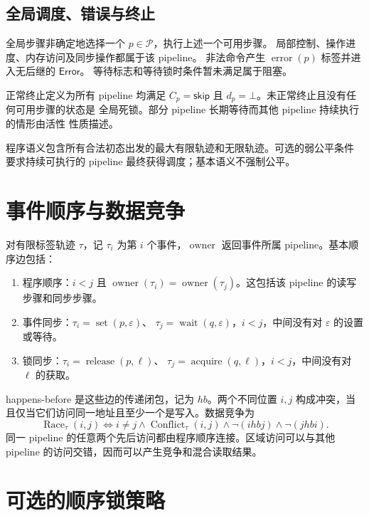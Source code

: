 \documentclass[UTF8,a4paper,11pt,fontset=fandol]{ctexart}
\newcommand{\kw}[1]{\mathsf{#1}}
\begin{document}
\subsection{全局调度、错误与终止}

全局步骤非确定地选择一个 $p\in\mathcal P$，执行上述一个可用步骤。
局部控制、操作进度、内存访问及同步操作都属于该 pipeline。
非法命令产生 $\operatorname{error}(p)$ 标签并进入无后继的 $\mathsf{Error}$。
等待标志和等待锁时条件暂未满足属于阻塞。

正常终止定义为所有 pipeline 均满足
$C_p=\kw{skip}$ 且 $d_p=\bot$。未正常终止且没有任何可用步骤的状态是
全局死锁。部分 pipeline 长期等待而其他 pipeline 持续执行的情形由活性
性质描述。

程序语义包含所有合法初态出发的最大有限轨迹和无限轨迹。可选的弱公平条件
要求持续可执行的 pipeline 最终获得调度；基本语义不强制公平。

\section{事件顺序与数据竞争}

对有限标签轨迹 $\tau$，记 $\tau_i$ 为第 $i$ 个事件，$\operatorname{owner}$
返回事件所属 pipeline。基本顺序边包括：
\begin{enumerate}
\item 程序顺序：$i<j$ 且 $\operatorname{owner}(\tau_i)=
  \operatorname{owner}(\tau_j)$。这包括该 pipeline 的读写步骤和同步步骤。
\item 事件同步：$\tau_i=\operatorname{set}(p,\varepsilon)$、
  $\tau_j=\operatorname{wait}(q,\varepsilon)$，$i<j$，中间没有对
  $\varepsilon$ 的设置或等待。
\item 锁同步：$\tau_i=\operatorname{release}(p,\ell)$、
  $\tau_j=\operatorname{acquire}(q,\ell)$，$i<j$，中间没有对 $\ell$
  的获取。
\end{enumerate}
happens-before 是这些边的传递闭包，记为 $\mathit{hb}$。两个不同位置
$i,j$ 构成冲突，当且仅当它们访问同一地址且至少一个是写入。数据竞争为
\[
\operatorname{Race}_\tau(i,j)\iff i\ne j\land
\operatorname{Conflict}_\tau(i,j)\land
\neg(i\mathrel{\mathit{hb}}j)\land\neg(j\mathrel{\mathit{hb}}i).
\]
同一 pipeline 的任意两个先后访问都由程序顺序连接。区域访问可以与其他
pipeline 的访问交错，因而可以产生竞争和混合读取结果。

\section{可选的顺序锁策略}
\end{document}
